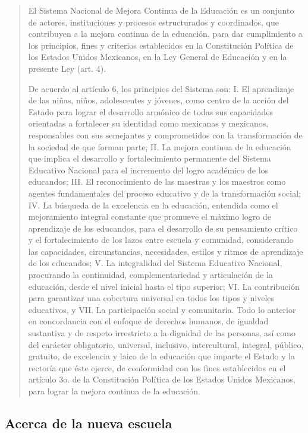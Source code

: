 \documentclass[
  12,
]{scrartcl}
\begin{document}
\begin{quote}
El Sistema Nacional de Mejora Continua de la Educación es un conjunto de
actores, instituciones y procesos estructurados y coordinados, que
contribuyen a la mejora continua de la educación, para dar cumplimiento
a los principios, fines y criterios establecidos en la Constitución
Política de los Estados Unidos Mexicanos, en la Ley General de Educación
y en la presente Ley (art. 4).

De acuerdo al artículo 6, los principios del Sistema son: I. El
aprendizaje de las niñas, niños, adolescentes y jóvenes, como centro de
la acción del Estado para lograr el desarrollo armónico de todas sus
capacidades orientadas a fortalecer su identidad como mexicanas y
mexicanos, responsables con sus semejantes y comprometidos con la
transformación de la sociedad de que forman parte; II. La mejora
continua de la educación que implica el desarrollo y fortalecimiento
permanente del Sistema Educativo Nacional para el incremento del logro
académico de los educandos; III. El reconocimiento de las maestras y los
maestros como agentes fundamentales del proceso educativo y de la
transformación social; IV. La búsqueda de la excelencia en la educación,
entendida como el mejoramiento integral constante que promueve el máximo
logro de aprendizaje de los educandos, para el desarrollo de su
pensamiento crítico y el fortalecimiento de los lazos entre escuela y
comunidad, considerando las capacidades, circunstancias, necesidades,
estilos y ritmos de aprendizaje de los educandos; V. La integralidad del
Sistema Educativo Nacional, procurando la continuidad, complementariedad
y articulación de la educación, desde el nivel inicial hasta el tipo
superior; VI. La contribución para garantizar una cobertura universal en
todos los tipos y niveles educativos, y VII. La participación social y
comunitaria. Todo lo anterior en concordancia con el enfoque de derechos
humanos, de igualdad sustantiva y de respeto irrestricto a la dignidad
de las personas, así como del carácter obligatorio, universal,
inclusivo, intercultural, integral, público, gratuito, de excelencia y
laico de la educación que imparte el Estado y la rectoría que éste
ejerce, de conformidad con los fines establecidos en el artículo 3o. de
la Constitución Política de los Estados Unidos Mexicanos, para lograr la
mejora continua de la educación.
\end{quote}

\hypertarget{acerca-de-la-nueva-escuela}{%
\subsection{Acerca de la nueva
escuela}\label{acerca-de-la-nueva-escuela}}
\end{document}
